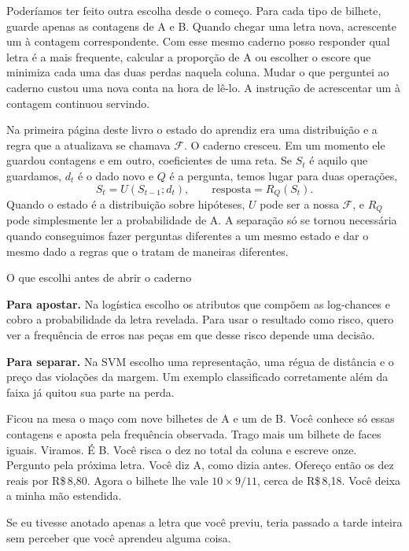 \documentclass[12pt,oneside]{article}
\newcommand{\itemq}[1]{\par\textbf{#1.}\enspace}
\begin{document}
Poderíamos ter feito outra escolha desde o começo. Para cada tipo de bilhete, guarde apenas as contagens de A e B. Quando chegar uma letra nova, acrescente um à contagem correspondente. Com esse mesmo caderno posso responder qual letra é a mais frequente, calcular a proporção de A ou escolher o escore que minimiza cada uma das duas perdas naquela coluna. Mudar o que perguntei ao caderno custou uma nova conta na hora de lê-lo. A instrução de acrescentar um à contagem continuou servindo.

Na primeira página deste livro o estado do aprendiz era uma distribuição e a regra que a atualizava se chamava $\mathcal F$. O caderno cresceu. Em um momento ele guardou contagens e em outro, coeficientes de uma reta. Se $S_t$ é aquilo que guardamos, $d_t$ é o dado novo e $Q$ é a pergunta, temos lugar para duas operações,
\[
        S_t=U(S_{t-1};d_t),\qquad
        \text{resposta}=R_Q(S_t).
\]
Quando o estado é a distribuição sobre hipóteses, $U$ pode ser a nossa $\mathcal F$, e $R_Q$ pode simplesmente ler a probabilidade de A. A separação só se tornou necessária quando conseguimos fazer perguntas diferentes a um mesmo estado e dar o mesmo dado a regras que o tratam de maneiras diferentes.

\begin{quadro}{O que escolhi antes de abrir o caderno}
\itemq{Para apostar} Na logística escolho os atributos que compõem as log-chances e cobro a probabilidade da letra revelada. Para usar o resultado como risco, quero ver a frequência de erros nas peças em que desse risco depende uma decisão.
\itemq{Para separar} Na SVM escolho uma representação, uma régua de distância e o preço das violações da margem. Um exemplo classificado corretamente além da faixa já quitou sua parte na perda.
\end{quadro}

Ficou na mesa o maço com nove bilhetes de A e um de B. Você conhece só essas contagens e aposta pela frequência observada. Trago mais um bilhete de faces iguais. Viramos. É B. Você risca o dez no total da coluna e escreve onze. Pergunto pela próxima letra. Você diz A, como dizia antes. Ofereço então os dez reais por R\$\,8,80. Agora o bilhete lhe vale $10\times9/11$, cerca de R\$\,8,18. Você deixa a minha mão estendida.

Se eu tivesse anotado apenas a letra que você previu, teria passado a tarde inteira sem perceber que você aprendeu alguma coisa.
\end{document}
